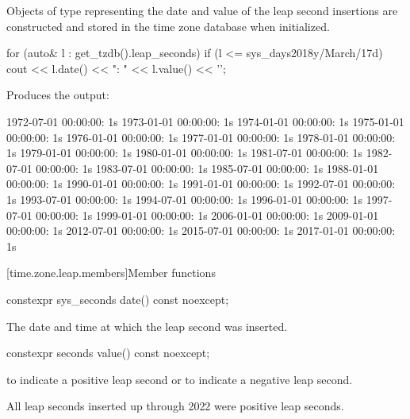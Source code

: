 \pnum
Objects of type  representing
the date and value of the leap second insertions
are constructed and stored in the time zone database when initialized.

\pnum
\begin{example}
\begin{codeblock}
for (auto& l : get_tzdb().leap_seconds)
  if (l <= sys_days{2018y/March/17d})
    cout << l.date() << ": " << l.value() << '\n';
\end{codeblock}

Produces the output:

\begin{outputblock}
1972-07-01 00:00:00: 1s
1973-01-01 00:00:00: 1s
1974-01-01 00:00:00: 1s
1975-01-01 00:00:00: 1s
1976-01-01 00:00:00: 1s
1977-01-01 00:00:00: 1s
1978-01-01 00:00:00: 1s
1979-01-01 00:00:00: 1s
1980-01-01 00:00:00: 1s
1981-07-01 00:00:00: 1s
1982-07-01 00:00:00: 1s
1983-07-01 00:00:00: 1s
1985-07-01 00:00:00: 1s
1988-01-01 00:00:00: 1s
1990-01-01 00:00:00: 1s
1991-01-01 00:00:00: 1s
1992-07-01 00:00:00: 1s
1993-07-01 00:00:00: 1s
1994-07-01 00:00:00: 1s
1996-01-01 00:00:00: 1s
1997-07-01 00:00:00: 1s
1999-01-01 00:00:00: 1s
2006-01-01 00:00:00: 1s
2009-01-01 00:00:00: 1s
2012-07-01 00:00:00: 1s
2015-07-01 00:00:00: 1s
2017-01-01 00:00:00: 1s
\end{outputblock}
\end{example}

[time.zone.leap.members]{Member functions}

%
\begin{itemdecl}
constexpr sys_seconds date() const noexcept;
\end{itemdecl}

\begin{itemdescr}
\pnum
\returns
The date and time at which the leap second was inserted.
\end{itemdescr}

%
\begin{itemdecl}
constexpr seconds value() const noexcept;
\end{itemdecl}

\begin{itemdescr}
\pnum
\returns
{} to indicate a positive leap second or
 to indicate a negative leap second.
\begin{note}
All leap seconds inserted up through 2022 were positive leap seconds.
\end{note}
\end{itemdescr}

